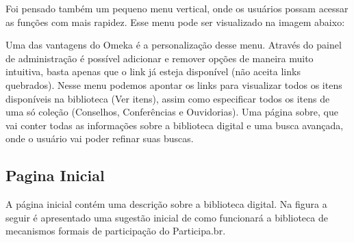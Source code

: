 Foi pensado também um pequeno menu vertical, onde os usuários possam acessar as funções com mais rapidez. Esse menu pode ser visualizado na imagem abaixo:



Uma das vantagens do Omeka é a personalização desse menu. Através do painel de administração é possível adicionar e remover opções de maneira muito intuitiva, basta apenas que o link já esteja disponível (não aceita links quebrados). Nesse menu podemos apontar os links para visualizar todos os itens disponíveis na biblioteca (Ver itens), assim como especificar todos os itens de uma só coleção (Conselhos, Conferências e Ouvidorias). Uma página sobre, que vai conter todas as informações sobre a biblioteca digital e uma busca avançada, onde o usuário vai poder refinar suas buscas.

\subsection{Pagina Inicial}

A página inicial contém uma descrição sobre a biblioteca digital. Na figura a seguir é apresentado uma sugestão inicial de como funcionará a biblioteca de mecanismos formais de participação do Participa.br.

